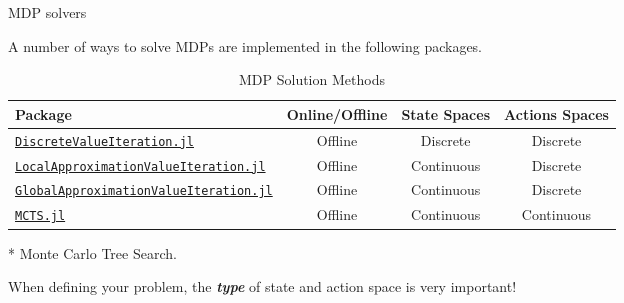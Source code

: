 \begin{frame}{MDP solvers}

A number of ways to solve MDPs are implemented in the following packages.

\begin{table}[!t]
    {\scriptsize
    \centering
    \caption{\label{tab:solutions} MDP Solution Methods}
    \begin{threeparttable}
    \begin{tabular}{lccc}
        \toprule
        \textbf{Package} & \textbf{Online/Offline} & \textbf{State Spaces} & \textbf{Actions Spaces}\\
        \midrule
        \href{https://github.com/JuliaPOMDP/DiscreteValueIteration.jl}{\texttt{DiscreteValueIteration.jl}} & Offline & Discrete & Discrete \\
        \href{https://github.com/JuliaPOMDP/LocalApproximationValueIteration.jl}{\texttt{LocalApproximationValueIteration.jl}} & Offline & Continuous & Discrete \\
        \href{https://github.com/JuliaPOMDP/GlobalApproximationValueIteration.jl}{\texttt{GlobalApproximationValueIteration.jl}} & Offline & Continuous & Discrete \\
        \href{https://github.com/JuliaPOMDP/MCTS.jl}{\texttt{MCTS.jl}}\tnote{*} & Offline & Continuous & Continuous \\
        \bottomrule
    \end{tabular}
    \begin{tablenotes}
        \scriptsize
        \item[*] {Monte Carlo Tree Search.}
    \end{tablenotes}
    \end{threeparttable}
    }
\end{table}

\begin{importantblock}
When defining your problem, the \textbf{\textit{type}} of state and action space is very important!
\end{importantblock}


\end{frame}


